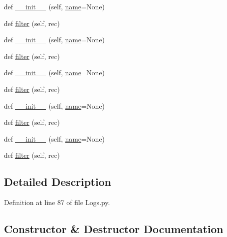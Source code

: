 \begin{DoxyCompactItemize}
\item 
def \hyperlink{classwaflib_1_1_logs_1_1log__filter_a6c54cc307bed856f8358a81128e99f27}{\+\_\+\+\_\+init\+\_\+\+\_\+} (self, \hyperlink{lib_2expat_8h_a1b49b495b59f9e73205b69ad1a2965b0}{name}=None)
\item 
def \hyperlink{classwaflib_1_1_logs_1_1log__filter_a4a0dd2406d20699ef95b5e3b59660af2}{filter} (self, rec)
\item 
def \hyperlink{classwaflib_1_1_logs_1_1log__filter_a6c54cc307bed856f8358a81128e99f27}{\+\_\+\+\_\+init\+\_\+\+\_\+} (self, \hyperlink{lib_2expat_8h_a1b49b495b59f9e73205b69ad1a2965b0}{name}=None)
\item 
def \hyperlink{classwaflib_1_1_logs_1_1log__filter_a4a0dd2406d20699ef95b5e3b59660af2}{filter} (self, rec)
\item 
def \hyperlink{classwaflib_1_1_logs_1_1log__filter_a6c54cc307bed856f8358a81128e99f27}{\+\_\+\+\_\+init\+\_\+\+\_\+} (self, \hyperlink{lib_2expat_8h_a1b49b495b59f9e73205b69ad1a2965b0}{name}=None)
\item 
def \hyperlink{classwaflib_1_1_logs_1_1log__filter_a4a0dd2406d20699ef95b5e3b59660af2}{filter} (self, rec)
\item 
def \hyperlink{classwaflib_1_1_logs_1_1log__filter_a6c54cc307bed856f8358a81128e99f27}{\+\_\+\+\_\+init\+\_\+\+\_\+} (self, \hyperlink{lib_2expat_8h_a1b49b495b59f9e73205b69ad1a2965b0}{name}=None)
\item 
def \hyperlink{classwaflib_1_1_logs_1_1log__filter_a4a0dd2406d20699ef95b5e3b59660af2}{filter} (self, rec)
\item 
def \hyperlink{classwaflib_1_1_logs_1_1log__filter_a6c54cc307bed856f8358a81128e99f27}{\+\_\+\+\_\+init\+\_\+\+\_\+} (self, \hyperlink{lib_2expat_8h_a1b49b495b59f9e73205b69ad1a2965b0}{name}=None)
\item 
def \hyperlink{classwaflib_1_1_logs_1_1log__filter_a4a0dd2406d20699ef95b5e3b59660af2}{filter} (self, rec)
\end{DoxyCompactItemize}


\subsection{Detailed Description}


Definition at line 87 of file Logs.\+py.



\subsection{Constructor \& Destructor Documentation}

